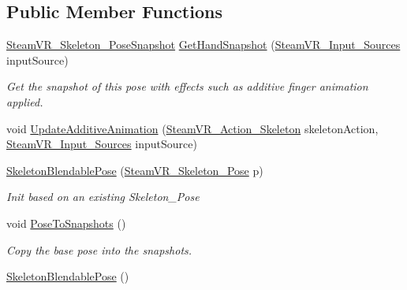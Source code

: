 \subsection*{Public Member Functions}
\begin{DoxyCompactItemize}
\item 
\mbox{\hyperlink{class_valve_1_1_v_r_1_1_steam_v_r___skeleton___pose_snapshot}{Steam\+V\+R\+\_\+\+Skeleton\+\_\+\+Pose\+Snapshot}} \mbox{\hyperlink{class_valve_1_1_v_r_1_1_steam_v_r___skeleton___poser_1_1_skeleton_blendable_pose_ab48d08e50a41fc69cb064e21aad6a90f}{Get\+Hand\+Snapshot}} (\mbox{\hyperlink{namespace_valve_1_1_v_r_a82e5bf501cc3aa155444ee3f0662853f}{Steam\+V\+R\+\_\+\+Input\+\_\+\+Sources}} input\+Source)
\begin{DoxyCompactList}\small\item\em Get the snapshot of this pose with effects such as additive finger animation applied. \end{DoxyCompactList}\item 
void \mbox{\hyperlink{class_valve_1_1_v_r_1_1_steam_v_r___skeleton___poser_1_1_skeleton_blendable_pose_a9ba8aba4e79dfea62b88efb174cac0cc}{Update\+Additive\+Animation}} (\mbox{\hyperlink{class_valve_1_1_v_r_1_1_steam_v_r___action___skeleton}{Steam\+V\+R\+\_\+\+Action\+\_\+\+Skeleton}} skeleton\+Action, \mbox{\hyperlink{namespace_valve_1_1_v_r_a82e5bf501cc3aa155444ee3f0662853f}{Steam\+V\+R\+\_\+\+Input\+\_\+\+Sources}} input\+Source)
\item 
\mbox{\hyperlink{class_valve_1_1_v_r_1_1_steam_v_r___skeleton___poser_1_1_skeleton_blendable_pose_ad816078e7535d3fe519af66f3421e7ac}{Skeleton\+Blendable\+Pose}} (\mbox{\hyperlink{class_valve_1_1_v_r_1_1_steam_v_r___skeleton___pose}{Steam\+V\+R\+\_\+\+Skeleton\+\_\+\+Pose}} p)
\begin{DoxyCompactList}\small\item\em Init based on an existing Skeleton\+\_\+\+Pose \end{DoxyCompactList}\item 
void \mbox{\hyperlink{class_valve_1_1_v_r_1_1_steam_v_r___skeleton___poser_1_1_skeleton_blendable_pose_a208239c9a4a9d5a1646f6b65990656c8}{Pose\+To\+Snapshots}} ()
\begin{DoxyCompactList}\small\item\em Copy the base pose into the snapshots. \end{DoxyCompactList}\item 
\mbox{\hyperlink{class_valve_1_1_v_r_1_1_steam_v_r___skeleton___poser_1_1_skeleton_blendable_pose_a011e64e6cbdefce11f0470c1d61a8447}{Skeleton\+Blendable\+Pose}} ()
\end{DoxyCompactItemize}
